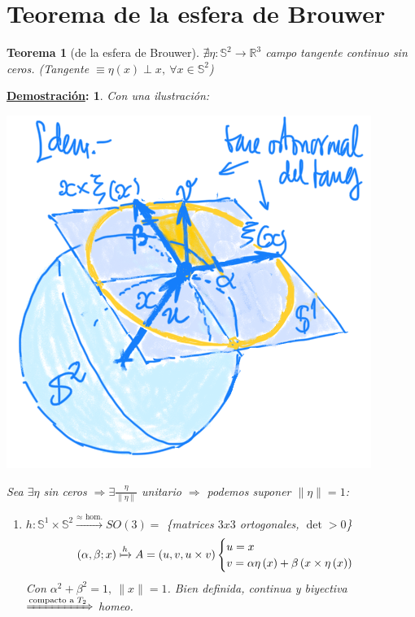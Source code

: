 \documentclass[10pt,a4paper,openright]{book}
\theoremstyle{break}
\newtheorem*{theo}{Teorema}
\newtheorem*{demo}{\underline{Demostración}:}
\begin{document}
\section{Teorema de la esfera de Brouwer}%
\label{sec:teorema_de_la_esfera_de_brouwer}
\begin{theo}[de la esfera de Brouwer]
$\nexists \eta: \mathbb{S}^{2} \rightarrow \mathbb{R}^{3}$ campo tangente continuo sin ceros. (Tangente $\equiv \eta\left( x \right) \perp x,\ \forall x \in \mathbb{S}^{2}$)
\end{theo}
\begin{demo}
Con una ilustración:
\begin{center}
    \includegraphics[scale=0.3]{images/dem_esfera_brouwer} 
\end{center}
Sea $\exists \eta$ sin ceros $\Rightarrow \exists \frac{\eta}{\lVert \eta \rVert}$ unitario $\Rightarrow$ podemos suponer $\lVert \eta \rVert = 1$:
\begin{enumerate}
    \item $h: \mathbb{S}^{1} \times \mathbb{S}^{2} \xrightarrow{\approx \text{ hom.}} SO\left( 3 \right) = $ \{matrices $3x3$ ortogonales, $\det > 0$\}
    \[
        \left( \alpha, \beta; x \right) \xmapsto{h} A = \left( u, v, u \times v \right) \begin{cases}
            u = x\\
            v = \alpha \eta\left( x \right) + \beta\left( x \times \eta\left( x \right) \right)
        \end{cases} 
    \]
    Con $\alpha^2 + \beta^2 = 1,\ \lVert x \rVert = 1$. Bien definida, continua y biyectiva $\xRightarrow{\text{compacto a } T_2}$ homeo.


\end{enumerate}
\end{demo}
\end{document}
